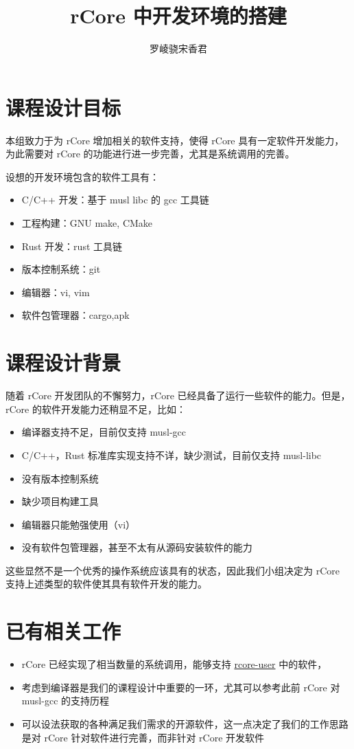 \documentclass{article}
\title{rCore 中开发环境的搭建}
\author{罗崚骁\quad 宋香君}
\affil{\texttt {\{luolx17, songxj17\}@mails.tsinghua.edu.cn}}
\begin{document}
    \maketitle

    \section{课程设计目标}
    本组致力于为 rCore 增加相关的软件支持，使得 rCore 具有一定软件开发能力，为此需要对 rCore 的功能进行进一步完善，尤其是系统调用的完善。

    设想的开发环境包含的软件工具有：
    \begin{itemize}
        \item C/C++ 开发：基于 musl libc 的 gcc 工具链
        \item 工程构建：GNU make, CMake
        \item Rust 开发：rust 工具链
        \item 版本控制系统：git
        \item 编辑器：vi, vim
        \item 软件包管理器：cargo,apk
    \end{itemize}

    \section{课程设计背景}
    随着 rCore 开发团队的不懈努力，rCore 已经具备了运行一些软件的能力。但是，rCore 的软件开发能力还稍显不足，比如：
    \begin{itemize}
        \item 编译器支持不足，目前仅支持 musl-gcc
        \item C/C++，Rust 标准库实现支持不详，缺少测试，目前仅支持 musl-libc
        \item 没有版本控制系统
        \item 缺少项目构建工具
        \item 编辑器只能勉强使用（vi）
        \item 没有软件包管理器，甚至不太有从源码安装软件的能力
    \end{itemize}

    这些显然不是一个优秀的操作系统应该具有的状态，因此我们小组决定为 rCore 支持上述类型的软件使其具有软件开发的能力。

    \section{已有相关工作}
    \begin{itemize}
        \item rCore 已经实现了相当数量的系统调用，能够支持 \href{https://github.com/rcore-os/rcore-user}{rcore-user} 中的软件，
        \item 考虑到编译器是我们的课程设计中重要的一环，尤其可以参考此前 rCore 对 musl-gcc 的支持历程
        \item 可以设法获取的各种满足我们需求的开源软件，这一点决定了我们的工作思路是对 rCore 针对软件进行完善，而非针对 rCore 开发软件
    \end{itemize}
\end{document}
